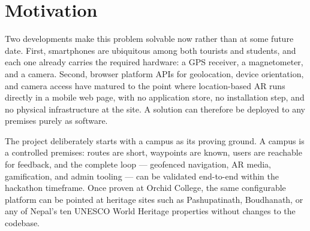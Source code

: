 \section{Motivation}
Two developments make this problem solvable now rather than at some future
date. First, smartphones are ubiquitous among both tourists and students,
and each one already carries the required hardware: a GPS receiver, a
magnetometer, and a camera. Second, browser platform APIs for geolocation,
device orientation, and camera access have matured to the point where
location-based AR runs directly in a mobile web page, with no application
store, no installation step, and no physical infrastructure at the site.
A solution can therefore be deployed to any premises purely as software.

The project deliberately starts with a campus as its proving ground. A
campus is a controlled premises: routes are short, waypoints are known,
users are reachable for feedback, and the complete loop --- geofenced
navigation, AR media, gamification, and admin tooling --- can be validated
end-to-end within the hackathon timeframe. Once proven at Orchid College,
the same configurable platform can be pointed at heritage sites such as
Pashupatinath, Boudhanath, or any of Nepal's ten UNESCO World Heritage
properties without changes to the codebase.
